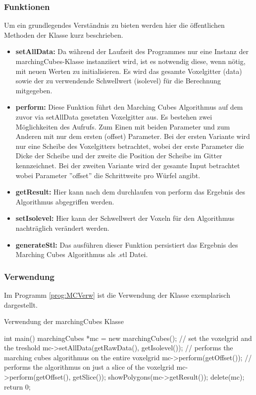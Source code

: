 \subsubsection{Funktionen}
Um ein grundlegendes Verständnis zu bieten werden hier die öffentlichen Methoden der Klasse kurz beschrieben. 
\begin{itemize}
	\item \textbf{setAllData:} Da während der Laufzeit des Programmes nur eine Instanz der marchingCubes-Klasse instanziiert wird, ist es notwendig diese, wenn nötig, mit neuen Werten zu initialisieren. Es wird das gesamte Voxelgitter (data) sowie der zu verwendende Schwellwert (isolevel) für die Berechnung mitgegeben.
	\item \textbf{perform:} Diese Funktion führt den Marching Cubes Algorithmus auf dem zuvor via setAllData gesetzten Voxelgitter aus. Es bestehen zwei Möglichkeiten des Aufrufs. Zum Einen mit beiden Parameter und zum Anderen mit nur dem ersten (offset) Parameter. Bei der ersten Variante wird nur eine Scheibe des Voxelgitters betrachtet, wobei der erste Parameter die Dicke der Scheibe und der zweite die Position der Scheibe im Gitter kennzeichnet. Bei der zweiten Variante wird der gesamte Input betrachtet wobei Parameter ''offset'' die Schrittweite pro Würfel angibt. 
	\item \textbf{getResult:} Hier kann nach dem durchlaufen von perform das Ergebnis des Algorithmus abgegriffen werden. 
	\item \textbf{setIsolevel:} Hier kann der Schwellwert der Voxeln für den Algorithmus nachträglich verändert werden.
	\item \textbf{generateStl:} Das ausführen dieser Funktion persistiert das Ergebnis des Marching Cubes Algorithmus als .stl Datei.
\end{itemize}
\subsubsection{Verwendung}
Im Programm \ref{prog:MCVerw} ist die Verwendung der Klasse exemplarisch dargestellt.
\begin{program}[H]
	\caption{Verwendung der marchingCubes Klasse}
	\label{prog:MCVerw}
	\begin{CCode}
		int main(){
			marchingCubes *mc = new marchingCubes();
			// set the voxelgrid and the treshold
			mc->setAllData(getRawData(), getIsolevel()); 
			// performs the marching cubes algorithmus on the entire voxelgrid
			mc->perform(getOffset()); 		
			// performs the algorithmus on just a slice of the voxelgrid 
			mc->perform(getOffset(), getSlice()); 
			showPolygons(mc->getResult()); 
			delete(mc);
			return 0;	
		}
	\end{CCode}
\end{program}
